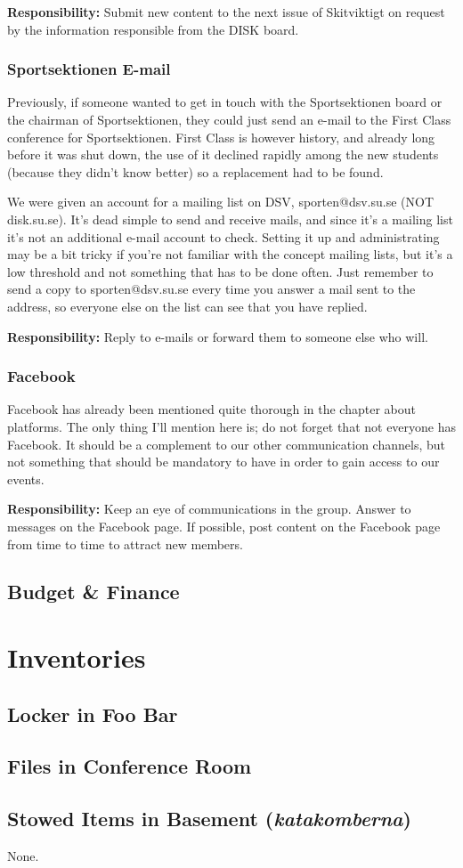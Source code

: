 \documentclass[12pt,a4paper]{article}
\begin{document}
			\textbf{Responsibility:} Submit new content to the next issue of Skitviktigt on request by the information responsible from the DISK board.
			\subsubsection{Sportsektionen E-mail}
			Previously, if someone wanted to get in touch with the Sportsektionen board or the chairman of Sportsektionen, they could just send an e-mail to the First Class conference for Sportsektionen. First Class is however history, and already long before it was shut down, the use of it declined rapidly among the new students (because they didn't know better) so a replacement had to be found.

			We were given an account for a mailing list on DSV, sporten@dsv.su.se (NOT disk.su.se). It's dead simple to send and receive mails, and since it's a mailing list it's not an additional e-mail account to check. Setting it up and administrating may be a bit tricky if you're not familiar with the concept mailing lists, but it's a low threshold and not something that has to be done often. Just remember to send a copy to sporten@dsv.su.se every time you answer a mail sent to the address, so everyone else on the list can see that you have replied.

			\textbf{Responsibility:} Reply to e-mails or forward them to someone else who will.
			\subsubsection{Facebook}
			Facebook has already been mentioned quite thorough in the chapter about platforms. The only thing I'll mention here is; do not forget that not everyone has Facebook. It should be a complement to our other communication channels, but not something that should be mandatory to have in order to gain access to our events.

			\textbf{Responsibility:} Keep an eye of communications in the group. Answer to messages on the Facebook page. If possible, post content on the Facebook page from time to time to attract new members.
		\subsection{Budget \& Finance}

	\section{Inventories}
		\subsection{Locker in Foo Bar}
		\subsection{Files in Conference Room}
		\subsection{Stowed Items in Basement (\emph{katakomberna})}
			None.
\end{document}

